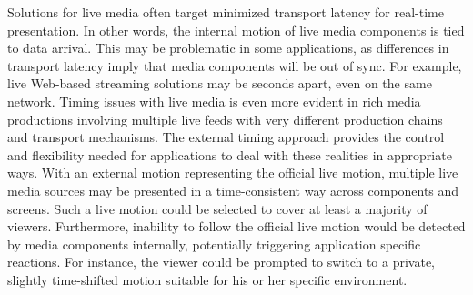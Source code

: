 Solutions for live media often target minimized transport latency for real-time 
presentation. In other words, the internal motion of live media
components is tied to data arrival. This may be problematic in some
applications, as differences in transport latency imply that media components
will be out of sync. For example, live Web-based streaming solutions may be
seconds apart, even on the same network. Timing issues with live media is even
more evident in rich media productions involving multiple live feeds with very
different production chains and transport mechanisms. The external timing
approach provides the control and flexibility needed for applications to deal
with these realities in appropriate ways. With an external motion representing
the official live motion, multiple live media sources may be presented in a
time-consistent way across components and screens. Such a live motion could be
selected to cover at least a majority of viewers. Furthermore, inability to
follow the official live motion would be detected by media components
internally, potentially triggering application specific reactions. For
instance, the viewer could be prompted to switch to a private, slightly time-shifted 
motion suitable for his or her specific environment.

